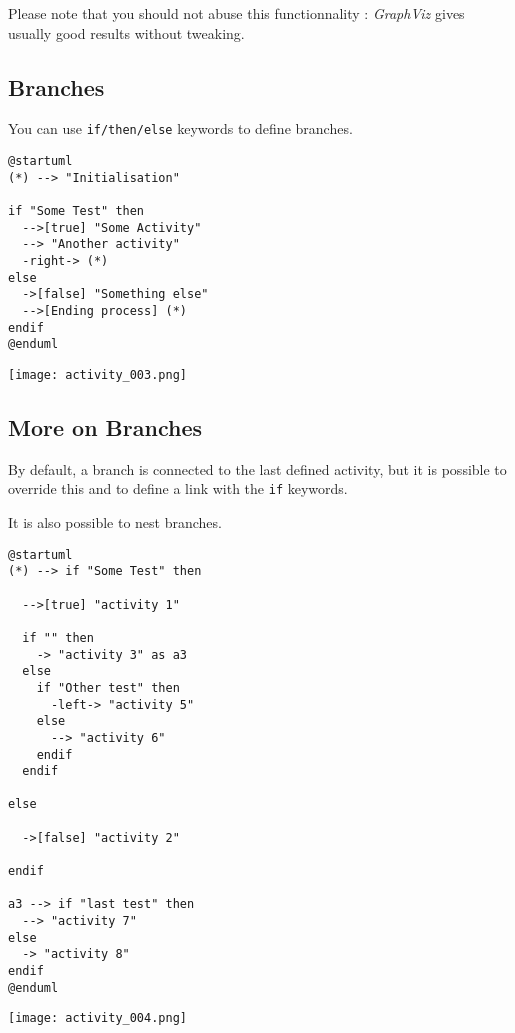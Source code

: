 Please note that you should not abuse this functionnality : \textit{GraphViz}
gives usually good results without tweaking.

\newpage \subsection{Branches}
\begin{description}
\item You can use \texttt{if/then/else} keywords to define branches.
\end{description}

\begin{lstlisting}
@startuml
(*) --> "Initialisation"

if "Some Test" then
  -->[true] "Some Activity"
  --> "Another activity"
  -right-> (*)
else
  ->[false] "Something else"
  -->[Ending process] (*)
endif
@enduml
\end{lstlisting}
\begin{center}
\texttt{[image: activity\_003.png]}
\end{center}


\newpage \subsection{More on Branches}
\begin{description}
\item By default, a branch is connected to the last defined activity,
but it is possible to override this and to define a link with the
\texttt{if} keywords.
\item It is also possible to nest branches.
\end{description}

\begin{lstlisting}
@startuml
(*) --> if "Some Test" then

  -->[true] "activity 1"
  
  if "" then
    -> "activity 3" as a3
  else
    if "Other test" then
      -left-> "activity 5"
    else
      --> "activity 6"
    endif
  endif
  
else

  ->[false] "activity 2"
  
endif

a3 --> if "last test" then
  --> "activity 7"
else
  -> "activity 8"
endif
@enduml
\end{lstlisting}
\begin{center}
\texttt{[image: activity\_004.png]}
\end{center}



